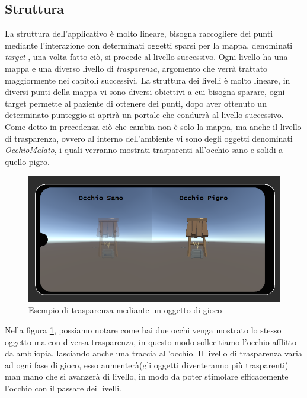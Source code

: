 \documentclass[10pt,a4paper]{article}
\begin{document}
    \subsection{Struttura}
    La struttura dell'applicativo è molto lineare, bisogna raccogliere dei punti mediante l'interazione con determinati oggetti sparsi per la mappa, denominati \textit{target} , una volta fatto ciò, si procede al livello successivo.
    Ogni livello ha una mappa e una diverso livello di \textit{trasparenza}, argomento che verrà trattato maggiormente nei capitoli successivi.
    La struttura dei livelli è molto lineare, in diversi punti della mappa vi sono diversi obiettivi a cui bisogna sparare, ogni target permette al paziente di ottenere dei punti, dopo aver ottenuto un determinato punteggio si aprirà un portale che condurrà al livello successivo.
    Come detto in precedenza ciò che cambia non è solo la mappa, ma anche il livello di trasparenza, ovvero al interno dell'ambiente vi sono degli oggetti denominati \textit{OcchioMalato}, i quali verranno mostrati trasparenti all'occhio sano e solidi a quello pigro.
    \begin{figure}[H]
    	\centering
    	\includegraphics[width=0.8\linewidth]{image/Pr_trasparenza}
    	\caption{Esempio di trasparenza mediante un oggetto di gioco}
    	\label{fig:pozzo}
    \end{figure}
    Nella figura \ref{fig:pozzo}, possiamo notare come hai due occhi venga mostrato lo stesso oggetto ma con diversa trasparenza, in questo modo sollecitiamo l'occhio afflitto da ambliopia, lasciando anche una traccia all'occhio.
    Il livello di trasparenza varia ad ogni fase di gioco, esso aumenterà(gli oggetti diventeranno più trasparenti) man mano che si avanzerà di livello, in modo da poter stimolare efficacemente l'occhio con il passare dei livelli.
\end{document}
